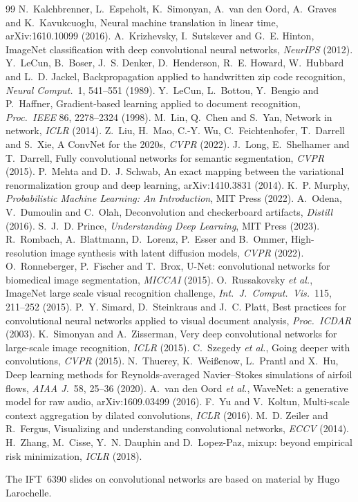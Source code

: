 \documentclass[11pt]{article}
\begin{document}
\begin{thebibliography}{99}
 N.~Kalchbrenner, L.~Espeholt, K.~Simonyan, A.~van den Oord, A.~Graves and K.~Kavukcuoglu, Neural machine translation in linear time, arXiv:1610.10099 (2016).
 A.~Krizhevsky, I.~Sutskever and G.~E. Hinton, ImageNet classification with deep convolutional neural networks, \emph{NeurIPS} (2012).
 Y.~LeCun, B.~Boser, J.~S. Denker, D.~Henderson, R.~E. Howard, W.~Hubbard and L.~D. Jackel, Backpropagation applied to handwritten zip code recognition, \emph{Neural Comput.}\ 1, 541--551 (1989).
 Y.~LeCun, L.~Bottou, Y.~Bengio and P.~Haffner, Gradient-based learning applied to document recognition, \emph{Proc.\ IEEE} 86, 2278--2324 (1998).
 M.~Lin, Q.~Chen and S.~Yan, Network in network, \emph{ICLR} (2014).
 Z.~Liu, H.~Mao, C.-Y. Wu, C.~Feichtenhofer, T.~Darrell and S.~Xie, A ConvNet for the 2020s, \emph{CVPR} (2022).
 J.~Long, E.~Shelhamer and T.~Darrell, Fully convolutional networks for semantic segmentation, \emph{CVPR} (2015).
 P.~Mehta and D.~J. Schwab, An exact mapping between the variational renormalization group and deep learning, arXiv:1410.3831 (2014).
 K.~P. Murphy, \emph{Probabilistic Machine Learning: An Introduction}, MIT Press (2022).
 A.~Odena, V.~Dumoulin and C.~Olah, Deconvolution and checkerboard artifacts, \emph{Distill} (2016).
 S.~J.~D. Prince, \emph{Understanding Deep Learning}, MIT Press (2023).
 R.~Rombach, A.~Blattmann, D.~Lorenz, P.~Esser and B.~Ommer, High-resolution image synthesis with latent diffusion models, \emph{CVPR} (2022).
 O.~Ronneberger, P.~Fischer and T.~Brox, U-Net: convolutional networks for biomedical image segmentation, \emph{MICCAI} (2015).
 O.~Russakovsky \emph{et al.}, ImageNet large scale visual recognition challenge, \emph{Int.\ J.\ Comput.\ Vis.}\ 115, 211--252 (2015).
 P.~Y. Simard, D.~Steinkraus and J.~C. Platt, Best practices for convolutional neural networks applied to visual document analysis, \emph{Proc.\ ICDAR} (2003).
 K.~Simonyan and A.~Zisserman, Very deep convolutional networks for large-scale image recognition, \emph{ICLR} (2015).
 C.~Szegedy \emph{et al.}, Going deeper with convolutions, \emph{CVPR} (2015).
 N.~Thuerey, K.~Wei{\ss}enow, L.~Prantl and X.~Hu, Deep learning methods for Reynolds-averaged Navier--Stokes simulations of airfoil flows, \emph{AIAA J.}\ 58, 25--36 (2020).
 A.~van den Oord \emph{et al.}, WaveNet: a generative model for raw audio, arXiv:1609.03499 (2016).
 F.~Yu and V.~Koltun, Multi-scale context aggregation by dilated convolutions, \emph{ICLR} (2016).
 M.~D. Zeiler and R.~Fergus, Visualizing and understanding convolutional networks, \emph{ECCV} (2014).
 H.~Zhang, M.~Cisse, Y.~N. Dauphin and D.~Lopez-Paz, mixup: beyond empirical risk minimization, \emph{ICLR} (2018).
\end{thebibliography}

\SourceNote
{\footnotesize\color{mute}The IFT~6390 slides on convolutional networks are based on material by Hugo Larochelle.\par}
\end{document}
